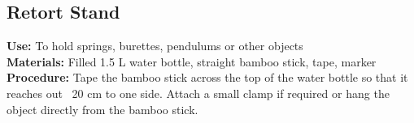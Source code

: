 \begin{multicols}{2}
%
%
%

\section{Retort Stand}
\label{sec:retort-stand}
\vspace{-10pt}
\textbf{Use:} To hold springs, burettes, pendulums or other objects\\
\textbf{Materials:} Filled 1.5 L water bottle, straight bamboo stick, tape, marker\\
\textbf{Procedure:} Tape the bamboo stick across the top of the water bottle so that it reaches out ~20 cm to one side. Attach a small clamp if required or hang the object directly from the bamboo stick.


\end{multicols}
